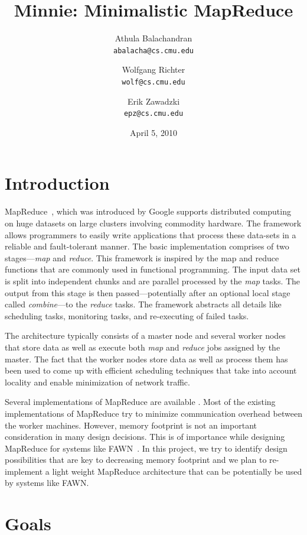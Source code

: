 \documentclass[10pt,letter,final,article,twocolumn]{article} %
\title{Minnie: Minimalistic MapReduce}
\author{Athula Balachandran \\
{\tt abalacha@cs.cmu.edu}
\and
Wolfgang Richter \\
{\tt wolf@cs.cmu.edu}
\and
Erik Zawadzki \\
{\tt epz@cs.cmu.edu}}
\date{April 5, 2010} %
\begin{document}

\maketitle

\section{Introduction}
MapReduce~\citep{mapreduce08}, which was introduced by Google supports distributed computing on huge datasets on large clusters involving commodity hardware. The framework allows programmers to easily write applications that process these data-sets in a reliable and fault-tolerant manner.  The basic implementation  comprises of two stages---\emph{map} and \emph{reduce}. This framework is inspired by the map and reduce functions that are commonly used in functional programming. The input data set is split into independent chunks and are parallel processed by the \emph{map} tasks. The output from this stage is then passed---potentially after an optional local stage called \emph{combine}---to the \emph{reduce} tasks. The framework abstracts all details like scheduling tasks, monitoring tasks, and re-executing of failed tasks. 

The architecture typically consists of a master node and several worker nodes that store data as well as execute both \emph{map} and \emph{reduce} jobs assigned by the master. The fact that the worker nodes store data as well as process them has been used to come up with efficient scheduling techniques that take into account locality and enable minimization of network traffic.

Several implementations of MapReduce are available \citep{mochi,hadoop10,disco10,sphere09}.  Most of the existing implementations of MapReduce try to minimize communication overhead between the worker machines. However, memory footprint is not an important consideration in many design decisions. This is of importance while designing MapReduce for systems like FAWN~\citep{fawn09}. In this project, we try to identify design possibilities that are key to decreasing memory footprint and we plan to re-implement a light weight MapReduce architecture that can be potentially be used by systems like FAWN.

\section{Goals}
\end{document}
